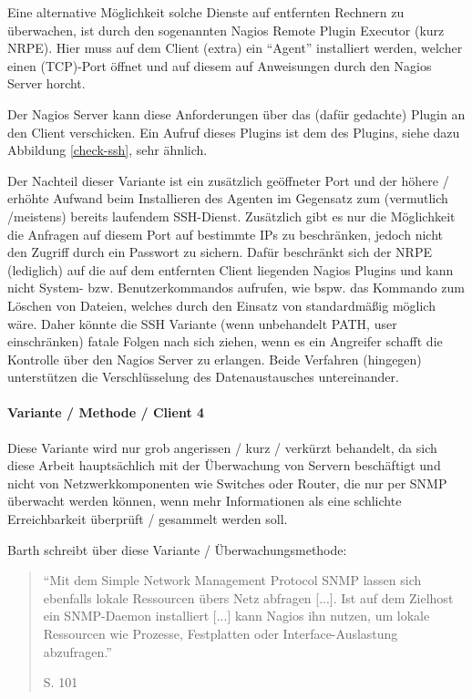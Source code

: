 Eine alternative Möglichkeit solche Dienste auf entfernten Rechnern zu überwachen, ist durch den sogenannten Nagios Remote Plugin Executor (kurz NRPE).
Hier muss auf dem Client (extra) ein "`Agent"' installiert werden, welcher einen (TCP)-Port öffnet und auf diesem auf Anweisungen durch den Nagios Server horcht.

Der Nagios Server kann diese Anforderungen über das (dafür gedachte) Plugin  an den Client verschicken.
Ein Aufruf dieses Plugins ist dem des  Plugins, siehe dazu Abbildung \ref{check-ssh}, sehr ähnlich.

Der Nachteil dieser Variante ist ein zusätzlich geöffneter Port und der höhere / erhöhte Aufwand beim Installieren des Agenten im Gegensatz zum (vermutlich /meistens) bereits laufendem SSH-Dienst.
Zusätzlich gibt es nur die Möglichkeit die Anfragen auf diesem Port auf bestimmte IPs zu beschränken, jedoch nicht den Zugriff durch ein Passwort zu sichern.
Dafür beschränkt sich der NRPE (lediglich) auf die auf dem entfernten Client liegenden Nagios Plugins und kann nicht System- bzw. Benutzerkommandos aufrufen, wie bspw. das  Kommando zum Löschen von Dateien, welches durch den Einsatz von  standardmäßig möglich wäre.
Daher könnte die SSH Variante (wenn unbehandelt PATH, user einschränken) fatale Folgen nach sich ziehen, wenn es ein Angreifer schafft die Kontrolle über den Nagios Server zu erlangen.
Beide Verfahren (hingegen) unterstützen die Verschlüsselung des Datenaustausches untereinander.

\paragraph{Variante / Methode / Client 4}
Diese Variante wird nur grob angerissen / kurz / verkürzt behandelt, da sich diese Arbeit hauptsächlich mit der Überwachung von Servern beschäftigt und nicht von Netzwerkkomponenten wie Switches oder Router, die nur per SNMP überwacht werden können, wenn mehr Informationen als eine schlichte Erreichbarkeit überprüft / gesammelt werden soll.

Barth schreibt über diese Variante / Überwachungsmethode:
\begin{quote}"`Mit dem Simple Network Management Protocol SNMP lassen sich ebenfalls lokale Ressourcen übers Netz abfragen [...]. Ist auf dem Zielhost ein SNMP-Daemon installiert [...] kann Nagios ihn nutzen, um lokale Ressourcen wie Prozesse, Festplatten oder Interface-Auslastung abzufragen."' \begin{flushright}\cite{Barth08} S. 101\end{flushright}\end{quote} 

